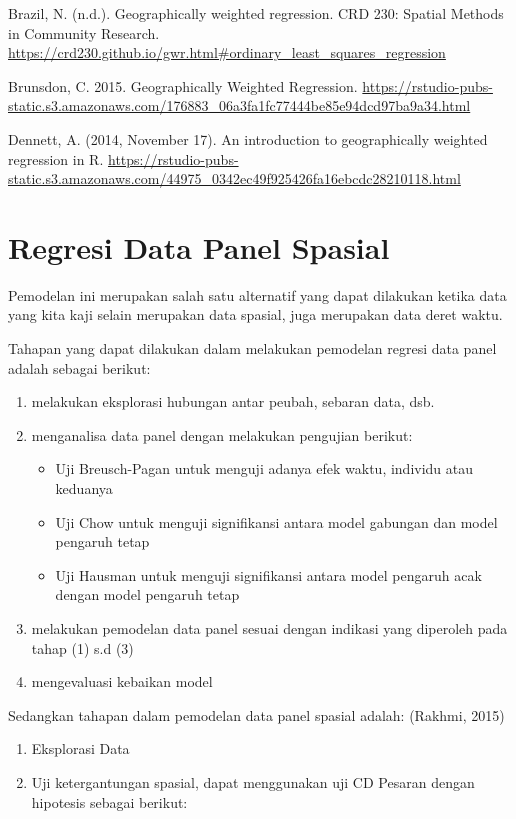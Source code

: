 \documentclass[
]{book}
\begin{document}
Brazil, N. (n.d.). Geographically weighted regression. CRD 230: Spatial Methods in Community Research. \url{https://crd230.github.io/gwr.html\#ordinary_least_squares_regression}

Brunsdon, C. 2015. Geographically Weighted Regression. \url{https://rstudio-pubs-static.s3.amazonaws.com/176883_06a3fa1fc77444be85e94dcd97ba9a34.html}

Dennett, A. (2014, November 17). An introduction to geographically weighted regression in R. \url{https://rstudio-pubs-static.s3.amazonaws.com/44975_0342ec49f925426fa16ebcdc28210118.html}

\hypertarget{regresi-data-panel-spasial}{%
\chapter{Regresi Data Panel Spasial}\label{regresi-data-panel-spasial}}

Pemodelan ini merupakan salah satu alternatif yang dapat dilakukan ketika data yang kita kaji selain merupakan data spasial, juga merupakan data deret waktu.

Tahapan yang dapat dilakukan dalam melakukan pemodelan regresi data panel adalah sebagai berikut:

\begin{enumerate}
\def\labelenumi{(\arabic{enumi})}
\item
  melakukan eksplorasi hubungan antar peubah, sebaran data, dsb.
\item
  menganalisa data panel dengan melakukan pengujian berikut:

  \begin{itemize}
  \item
    Uji Breusch-Pagan untuk menguji adanya efek waktu, individu atau keduanya
  \item
    Uji Chow untuk menguji signifikansi antara model gabungan dan model pengaruh tetap
  \item
    Uji Hausman untuk menguji signifikansi antara model pengaruh acak dengan model pengaruh tetap
  \end{itemize}
\item
  melakukan pemodelan data panel sesuai dengan indikasi yang diperoleh pada tahap (1) s.d (3)
\item
  mengevaluasi kebaikan model
\end{enumerate}

Sedangkan tahapan dalam pemodelan data panel spasial adalah: (Rakhmi, 2015)

\begin{enumerate}
\def\labelenumi{(\arabic{enumi})}
\item
  Eksplorasi Data
\item
  Uji ketergantungan spasial, dapat menggunakan uji CD Pesaran dengan hipotesis sebagai berikut:
\end{enumerate}
\end{document}
